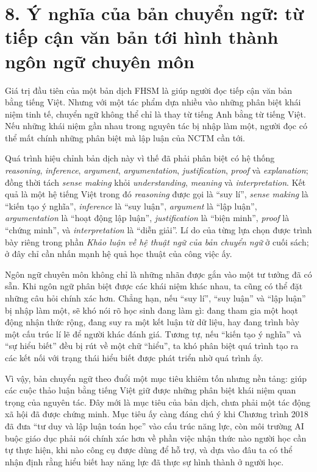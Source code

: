 {}
\section*{8. Ý nghĩa của bản chuyển ngữ: từ tiếp cận văn bản tới hình thành ngôn ngữ chuyên môn}

Giá trị đầu tiên của một bản dịch FHSM là giúp người đọc tiếp cận văn bản bằng tiếng Việt. Nhưng với một tác phẩm dựa nhiều vào những phân biệt khái niệm tinh tế, chuyển ngữ không thể chỉ là thay từ tiếng Anh bằng từ tiếng Việt. Nếu những khái niệm gần nhau trong nguyên tác bị nhập làm một, người đọc có thể mất chính những phân biệt mà lập luận của NCTM cần tới.

Quá trình hiệu chỉnh bản dịch này vì thế đã phải phân biệt có hệ thống \emph{reasoning}, \emph{inference}, \emph{argument}, \emph{argumentation}, \emph{justification}, \emph{proof} và \emph{explanation}; đồng thời tách \emph{sense making} khỏi \emph{understanding}, \emph{meaning} và \emph{interpretation}. Kết quả là một hệ tiếng Việt trong đó \emph{reasoning} được gọi là ``suy lí'', \emph{sense making} là ``kiến tạo ý nghĩa'', \emph{inference} là ``suy luận'', \emph{argument} là ``lập luận'', \emph{argumentation} là ``hoạt động lập luận'', \emph{justification} là ``biện minh'', \emph{proof} là ``chứng minh'', và \emph{interpretation} là ``diễn giải''. Lí do của từng lựa chọn được trình bày riêng trong phần \emph{Khảo luận về hệ thuật ngữ của bản chuyển ngữ} ở cuối sách; ở đây chỉ cần nhấn mạnh hệ quả học thuật của công việc ấy.

Ngôn ngữ chuyên môn không chỉ là những nhãn được gắn vào một tư tưởng đã có sẵn. Khi ngôn ngữ phân biệt được các khái niệm khác nhau, ta cũng có thể đặt những câu hỏi chính xác hơn. Chẳng hạn, nếu ``suy lí'', ``suy luận'' và ``lập luận'' bị nhập làm một, sẽ khó nói rõ học sinh đang làm gì: đang tham gia một hoạt động nhận thức rộng, đang suy ra một kết luận từ dữ liệu, hay đang trình bày một cấu trúc lí lẽ để người khác đánh giá. Tương tự, nếu ``kiến tạo ý nghĩa'' và ``sự hiểu biết'' đều bị rút về một chữ ``hiểu'', ta khó phân biệt quá trình tạo ra các kết nối với trạng thái hiểu biết được phát triển nhờ quá trình ấy.

Vì vậy, bản chuyển ngữ theo đuổi một mục tiêu khiêm tốn nhưng nền tảng: giúp các cuộc thảo luận bằng tiếng Việt giữ được những phân biệt khái niệm quan trọng của nguyên tác. Đây mới là mục tiêu của bản dịch, chưa phải một tác động xã hội đã được chứng minh. Mục tiêu ấy càng đáng chú ý khi Chương trình 2018 đã đưa ``tư duy và lập luận toán học'' vào cấu trúc năng lực, còn môi trường AI buộc giáo dục phải nói chính xác hơn về phần việc nhận thức nào người học cần tự thực hiện, khi nào công cụ được dùng để hỗ trợ, và dựa vào đâu ta có thể nhận định rằng hiểu biết hay năng lực đã thực sự hình thành ở người học.

